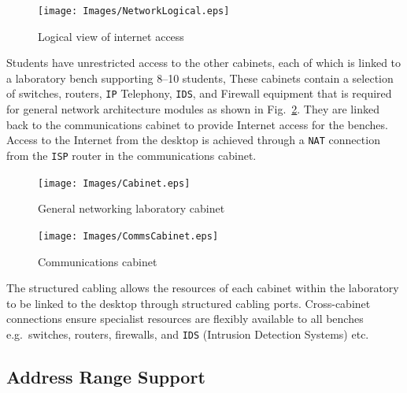 \documentclass[10pt,journal]{IEEEtran}
\begin{document}
\begin{figure}[ht]
  \centering
  \begin{minipage}[ht]{0.45\textwidth}
    \texttt{[image: Images/NetworkLogical.eps]}
  \caption{Logical view of internet access}
  \label{fig:NetworkLogical}
  \end{minipage}
\end{figure}
  
Students have unrestricted access to the other cabinets, each of which is
linked to a laboratory bench supporting 8--10 students, These cabinets contain a selection of switches, routers, \texttt{IP} Telephony, \texttt{IDS}, and Firewall equipment that is required for general network architecture modules as shown in Fig.~\ref{fig:Cabinet}.
They are linked back to the communications cabinet to provide Internet access
for the benches. Access to the Internet from the desktop is achieved through a
\texttt{NAT} connection from the \texttt{ISP} router in the communications
cabinet. 

\begin{figure}[ht]
  \centering
  \begin{minipage}[ht]{0.45\textwidth}
    \texttt{[image: Images/Cabinet.eps]}
    \caption{General networking laboratory cabinet\label{fig:Cabinet}}
  \end{minipage}
\end{figure}

\begin{figure}[ht]
  \centering
  \begin{minipage}[ht]{0.45\textwidth}
    \texttt{[image: Images/CommsCabinet.eps]}
    \caption{Communications cabinet\label{fig:CommsCabinet}}
  \end{minipage}
\end{figure}


The structured cabling allows the resources of each cabinet within the
laboratory to be linked to the desktop through structured cabling ports.
Cross-cabinet connections ensure specialist resources are flexibly available to
all benches e.g.\ switches, routers, firewalls, and \texttt{IDS} (Intrusion
Detection Systems) etc.

\subsection{Address Range Support}
\end{document}
